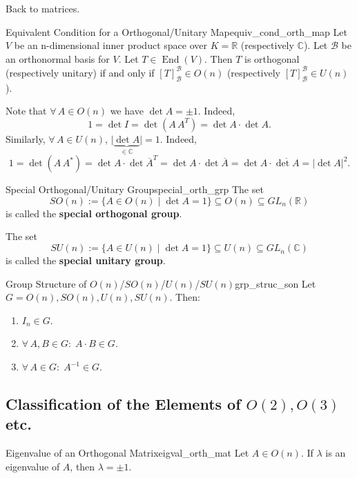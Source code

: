 Back to matrices.

\begin{proposition}{Equivalent Condition for a Orthogonal/Unitary Map}{equiv_cond_orth_map}
	Let $V$ be an n-dimensional inner product space over $K = \mathbb{R}$ (respectively $\mathbb{C}$). Let $\mathcal{B}$ be an orthonormal basis for $V$. Let $T \in \operatorname{End}(V)$. Then $T$ is orthogonal (respectively unitary) if and only if $[T]^{\mathcal{B}}_{\mathcal{B}} \in O(n)$ (respectively $[T]^{\mathcal{B}}_{\mathcal{B}} \in U(n)$).
\end{proposition}

Note that $\forall \, A \in O(n)$ we have $\det A = \pm 1$. Indeed,
\[
	1 = \det I = \det (A \, A^T) = \det A \cdot \det A.
\]
Similarly, $\forall \, A \in U(n)$, $\vert \underbrace{\det A}_{\displaystyle \in \mathbb{C}} \vert = 1$. Indeed,
\[
	1 = \det (A \, A^*) = \det A \cdot \det \overline{A}^T = \det A \cdot \det \overline{A} = \det A \cdot \overline{\det A} = \vert \det A \vert ^2.
\]

\begin{definition}{Special Orthogonal/Unitary Group}{special_orth_grp}
	The set
	\[
		SO(n) := \{A \in O(n) \;|\; \det A = 1\} \subseteq O(n) \subseteq GL_n(\mathbb{R})
	\]
	is called the \textbf{special orthogonal group}.
	
	The set
	\[
		SU(n) := \{A \in U(n) \;|\; \det A = 1\} \subseteq U(n) \subseteq GL_n(\mathbb{C})
	\]
	is called the \textbf{special unitary group}.
\end{definition}

\begin{proposition}{Group Structure of $O(n)$/$SO(n)$/$U(n)$/$SU(n)$}{grp_struc_son}
	Let $G = O(n), SO(n), U(n), SU(n)$. Then:
	\begin{enumerate}
		\item $I_n \in G$.
		\item $\forall \, A,B \in G : \; A\cdot B \in G$.
		\item $\forall \, A \in G :\; A^{-1} \in G$.
	\end{enumerate}
\end{proposition}

\subsection{Classification of the Elements of $O(2), O(3)$ etc.}
\begin{lemma}{Eigenvalue of an Orthogonal Matrix}{eigval_orth_mat}
	Let $A \in O(n)$. If $\lambda$ is an eigenvalue of $A$, then $\lambda = \pm 1$.
\end{lemma}

